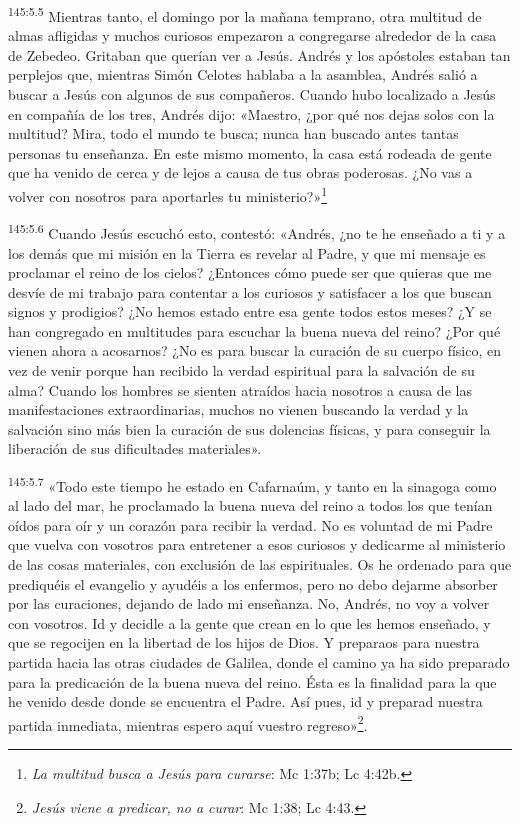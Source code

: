 \par 
\textsuperscript{145:5.5} Mientras tanto, el domingo por la mañana temprano, otra multitud de almas afligidas y muchos curiosos empezaron a congregarse alrededor de la casa de Zebedeo. Gritaban que querían ver a Jesús. Andrés y los apóstoles estaban tan perplejos que, mientras Simón Celotes hablaba a la asamblea, Andrés salió a buscar a Jesús con algunos de sus compañeros. Cuando hubo localizado a Jesús en compañía de los tres, Andrés dijo: «Maestro, ¿por qué nos dejas solos con la multitud? Mira, todo el mundo te busca; nunca han buscado antes tantas personas tu enseñanza. En este mismo momento, la casa está rodeada de gente que ha venido de cerca y de lejos a causa de tus obras poderosas. ¿No vas a volver con nosotros para aportarles tu ministerio?»\footnote{\textit{La multitud busca a Jesús para curarse}: Mc 1:37b; Lc 4:42b.}

\par 
\textsuperscript{145:5.6} Cuando Jesús escuchó esto, contestó: «Andrés, ¿no te he enseñado a ti y a los demás que mi misión en la Tierra es revelar al Padre, y que mi mensaje es proclamar el reino de los cielos? ¿Entonces cómo puede ser que quieras que me desvíe de mi trabajo para contentar a los curiosos y satisfacer a los que buscan signos y prodigios? ¿No hemos estado entre esa gente todos estos meses? ¿Y se han congregado en multitudes para escuchar la buena nueva del reino? ¿Por qué vienen ahora a acosarnos? ¿No es para buscar la curación de su cuerpo físico, en vez de venir porque han recibido la verdad espiritual para la salvación de su alma? Cuando los hombres se sienten atraídos hacia nosotros a causa de las manifestaciones extraordinarias, muchos no vienen buscando la verdad y la salvación sino más bien la curación de sus dolencias físicas, y para conseguir la liberación de sus dificultades materiales».

\par 
\textsuperscript{145:5.7} «Todo este tiempo he estado en Cafarnaúm, y tanto en la sinagoga como al lado del mar, he proclamado la buena nueva del reino a todos los que tenían oídos para oír y un corazón para recibir la verdad. No es voluntad de mi Padre que vuelva con vosotros para entretener a esos curiosos y dedicarme al ministerio de las cosas materiales, con exclusión de las espirituales. Os he ordenado para que prediquéis el evangelio y ayudéis a los enfermos, pero no debo dejarme absorber por las curaciones, dejando de lado mi enseñanza. No, Andrés, no voy a volver con vosotros. Id y decidle a la gente que crean en lo que les hemos enseñado, y que se regocijen en la libertad de los hijos de Dios. Y preparaos para nuestra partida hacia las otras ciudades de Galilea, donde el camino ya ha sido preparado para la predicación de la buena nueva del reino. Ésta es la finalidad para la que he venido desde donde se encuentra el Padre. Así pues, id y preparad nuestra partida inmediata, mientras espero aquí vuestro regreso»\footnote{\textit{Jesús viene a predicar, no a curar}: Mc 1:38; Lc 4:43.}.


